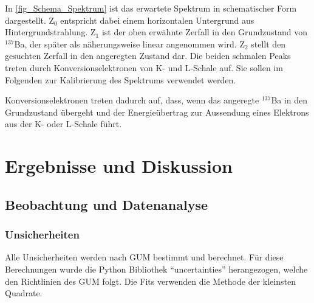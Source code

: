 \documentclass[
	a4paper,
	12pt,
	pagesize,
	ngerman
]{scrartcl}
\begin{document}
	In \cref{fig_Schema_Spektrum} ist das erwartete Spektrum in schematischer Form dargestellt.
	Z$_0$ entspricht dabei einem horizontalen Untergrund aus Hintergrundstrahlung.
	Z$_1$ ist der oben erwähnte Zerfall in den Grundzustand von $^{137}$Ba, der später als näherungsweise linear angenommen wird.
	Z$_2$ stellt den gesuchten Zerfall in den angeregten Zustand dar.
	Die beiden schmalen Peaks treten durch Konversionselektronen von K- und L-Schale auf.
	Sie sollen im Folgenden zur Kalibrierung des Spektrums verwendet werden.

	Konversionselektronen treten dadurch auf, dass, wenn das angeregte $^{137}$Ba in den Grundzustand übergeht und der Energieübertrag zur Aussendung eines Elektrons aus der K- oder L-Schale führt.

	\section{Ergebnisse und Diskussion}


	\subsection{Beobachtung und Datenanalyse}
	\subsubsection{Unsicherheiten}
	Alle Unsicherheiten werden nach GUM bestimmt und berechnet.
	Für diese Berechnungen wurde die Python Bibliothek \enquote{uncertainties} herangezogen, welche den Richtlinien des GUM folgt.
	Die Fits verwenden die Methode der kleinsten Quadrate.
\end{document}
